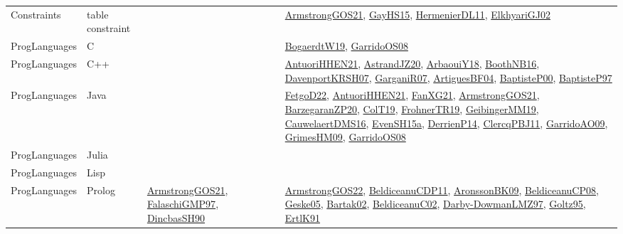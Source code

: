 {\begin{longtable}{lp{3cm}>{\raggedright}p{6cm}>{\raggedright}p{6cm}p{8cm}}
Constraints & table constraint &  &  & \href{papers/ArmstrongGOS21.pdf}{ArmstrongGOS21}\cite{ArmstrongGOS21}, \href{papers/GayHS15.pdf}{GayHS15}\cite{GayHS15}, \href{papers/HermenierDL11.pdf}{HermenierDL11}\cite{HermenierDL11}, \href{papers/ElkhyariGJ02.pdf}{ElkhyariGJ02}\cite{ElkhyariGJ02}\\
ProgLanguages & C  &  &  & \href{papers/BogaerdtW19.pdf}{BogaerdtW19}\cite{BogaerdtW19}, \href{articles/GarridoOS08.pdf}{GarridoOS08}\cite{GarridoOS08}\\
ProgLanguages & C++ &  &  & \href{papers/AntuoriHHEN21.pdf}{AntuoriHHEN21}\cite{AntuoriHHEN21}, \href{articles/AstrandJZ20.pdf}{AstrandJZ20}\cite{AstrandJZ20}, \href{papers/ArbaouiY18.pdf}{ArbaouiY18}\cite{ArbaouiY18}, \href{papers/BoothNB16.pdf}{BoothNB16}\cite{BoothNB16}, \href{papers/DavenportKRSH07.pdf}{DavenportKRSH07}\cite{DavenportKRSH07}, \href{papers/GarganiR07.pdf}{GarganiR07}\cite{GarganiR07}, \href{papers/ArtiguesBF04.pdf}{ArtiguesBF04}\cite{ArtiguesBF04}, \href{articles/BaptisteP00.pdf}{BaptisteP00}\cite{BaptisteP00}, \href{papers/BaptisteP97.pdf}{BaptisteP97}\cite{BaptisteP97}\\
ProgLanguages & Java &  &  & \href{articles/FetgoD22.pdf}{FetgoD22}\cite{FetgoD22}, \href{papers/AntuoriHHEN21.pdf}{AntuoriHHEN21}\cite{AntuoriHHEN21}, \href{articles/FanXG21.pdf}{FanXG21}\cite{FanXG21}, \href{papers/ArmstrongGOS21.pdf}{ArmstrongGOS21}\cite{ArmstrongGOS21}, \href{papers/BarzegaranZP20.pdf}{BarzegaranZP20}\cite{BarzegaranZP20}, \href{papers/ColT19.pdf}{ColT19}\cite{ColT19}, \href{papers/FrohnerTR19.pdf}{FrohnerTR19}\cite{FrohnerTR19}, \href{papers/GeibingerMM19.pdf}{GeibingerMM19}\cite{GeibingerMM19}, \href{papers/CauwelaertDMS16.pdf}{CauwelaertDMS16}\cite{CauwelaertDMS16}, \href{articles/EvenSH15a.pdf}{EvenSH15a}\cite{EvenSH15a}, \href{papers/DerrienP14.pdf}{DerrienP14}\cite{DerrienP14}, \href{papers/ClercqPBJ11.pdf}{ClercqPBJ11}\cite{ClercqPBJ11}, \href{articles/GarridoAO09.pdf}{GarridoAO09}\cite{GarridoAO09}, \href{papers/GrimesHM09.pdf}{GrimesHM09}\cite{GrimesHM09}, \href{articles/GarridoOS08.pdf}{GarridoOS08}\cite{GarridoOS08}\\
ProgLanguages & Julia &  &  & \\
ProgLanguages & Lisp &  &  & \\
ProgLanguages & Prolog & \href{papers/ArmstrongGOS21.pdf}{ArmstrongGOS21}\cite{ArmstrongGOS21}, \href{articles/FalaschiGMP97.pdf}{FalaschiGMP97}\cite{FalaschiGMP97}, \href{articles/DincbasSH90.pdf}{DincbasSH90}\cite{DincbasSH90} &  & \href{papers/ArmstrongGOS22.pdf}{ArmstrongGOS22}\cite{ArmstrongGOS22}, \href{articles/BeldiceanuCDP11.pdf}{BeldiceanuCDP11}\cite{BeldiceanuCDP11}, \href{papers/AronssonBK09.pdf}{AronssonBK09}\cite{AronssonBK09}, \href{papers/BeldiceanuCP08.pdf}{BeldiceanuCP08}\cite{BeldiceanuCP08}, \href{papers/Geske05.pdf}{Geske05}\cite{Geske05}, \href{papers/Bartak02.pdf}{Bartak02}\cite{Bartak02}, \href{papers/BeldiceanuC02.pdf}{BeldiceanuC02}\cite{BeldiceanuC02}, \href{articles/Darby-DowmanLMZ97.pdf}{Darby-DowmanLMZ97}\cite{Darby-DowmanLMZ97}, \href{papers/Goltz95.pdf}{Goltz95}\cite{Goltz95}, \href{papers/ErtlK91.pdf}{ErtlK91}\cite{ErtlK91}\\

\end{longtable}}
